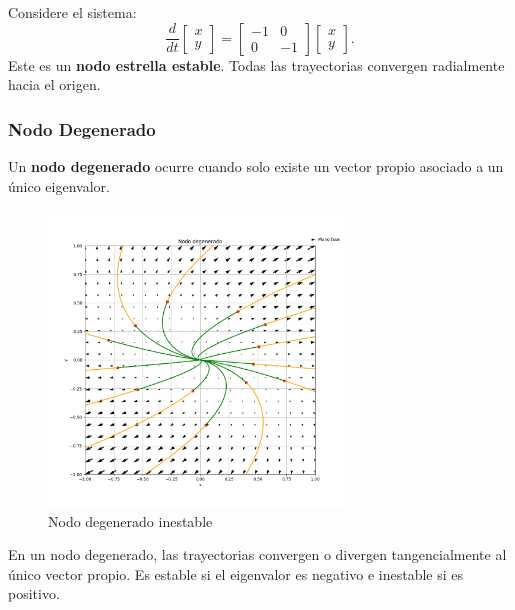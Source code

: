 \begin{example}
Considere el sistema:
\[
\frac{d}{dt} \begin{bmatrix} x \\ y \end{bmatrix} = \begin{bmatrix} -1 & 0 \\ 0 & -1 \end{bmatrix} \begin{bmatrix} x \\ y \end{bmatrix}.
\]
Este es un \textbf{nodo estrella estable}. Todas las trayectorias convergen radialmente hacia el origen.
\end{example}

\subsubsection{Nodo Degenerado}

\begin{definition}
Un \textbf{nodo degenerado} ocurre cuando solo existe un vector propio asociado a un único eigenvalor.
\end{definition}

\begin{figure}[h]
    \centering
    \includegraphics[width=0.7\textwidth]{Img/NodoDegenerado.png}
    \caption{Nodo degenerado inestable}
    \label{fig:nodo_degenerado}
\end{figure}

En un nodo degenerado, las trayectorias convergen o divergen tangencialmente al único vector propio. Es estable si el eigenvalor es negativo e inestable si es positivo.


